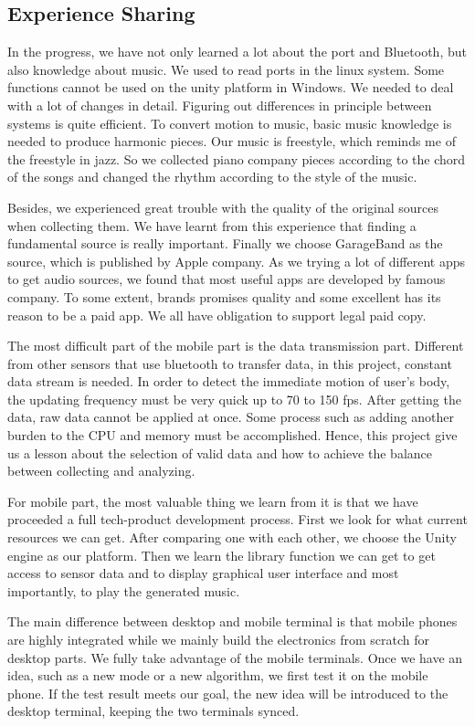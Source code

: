 \subsection{Experience Sharing}

In the progress, we have not only learned a lot about the port and Bluetooth,
but also knowledge about music. We used to read ports in the linux system. Some
functions cannot be used on the unity platform in Windows. We needed to deal
with a lot of changes in detail. Figuring out differences in principle between
systems is quite efficient. To convert motion to music, basic music knowledge is
needed to produce harmonic pieces. Our music is freestyle, which reminds me of
the freestyle in jazz. So we collected piano company pieces according to the
chord of the songs and changed the rhythm according to the style of the music.

Besides, we experienced great trouble with the quality of the original sources
when collecting them. We have learnt from this experience that finding a
fundamental  source is really important. Finally we choose GarageBand as the
source, which is published by Apple company. As we trying a lot of different
apps to get audio sources, we found that most useful apps are developed by
famous company. To some extent,  brands promises quality and some excellent has
its reason to be a paid app. We all have obligation to support legal paid copy. 

The most difficult part of the mobile part is the data transmission part.
Different from other sensors that use bluetooth to transfer data, in this
project, constant data stream is needed. In order to detect the immediate motion
of user's body, the updating frequency must be very quick up to 70 to 150 fps.
After getting the data, raw data cannot be applied at once. Some process such as
adding another burden to the CPU and memory must be accomplished. Hence, this
project give us a lesson about the selection of valid data and how to achieve
the balance between collecting and analyzing.  

For mobile part, the most valuable thing we learn from it is that we have
proceeded a full tech-product development process. First we look for what
current resources we can get. After comparing one with each other, we choose the
Unity engine as our platform. Then we learn the library function we can get to
get access to sensor data and to display graphical user interface and most
importantly, to play the generated music. 

The main difference between desktop and mobile terminal is that mobile phones
are highly integrated while we mainly build the electronics from scratch for
desktop parts. We fully take advantage of the mobile terminals. Once we have an
idea, such as a new mode or a new algorithm, we first test it on the mobile
phone. If the test result meets our goal, the new idea will be introduced to the
desktop terminal, keeping the two terminals synced. 

